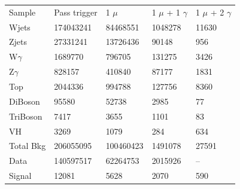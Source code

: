 \documentclass{beamer}
\begin{document}
 {

    \scriptsize

    \begin{tabular}{l | l | l | l | l |}
    Sample    & Pass trigger & 1 $\mu$   & 1 $\mu$ + 1 $\gamma$ & 1 $\mu$ + 2 $\gamma$ \\
    Wjets     & 174043241    & 84468551     & 1048278   &  11630                       \\
    Zjets     & 27331241     & 13726436     & 90148     &  956                       \\
    W$\gamma$ & 1689770      & 796705       & 131275    &  3426                       \\
    Z$\gamma$ & 828157       & 410840       & 87177     &  1831                       \\
    Top       & 2044336      & 994788       & 127756    &  8360                       \\
    DiBoson   & 95580        & 52738        &  2985     &  77                       \\
    TriBoson  & 7417         & 3655         & 1101      &  83                       \\
    VH        & 3269         & 1079         & 284       &  634                       \\
    Total Bkg & 206055095    & 100460423    & 1491078   &  27591                 \\
    Data      & 140597517    & 62264753     &  2015926  &  --                    \\
    Signal    & 12081        & 5628         &  2070     &  590                   \\
    \end{tabular}

}
\end{document}
